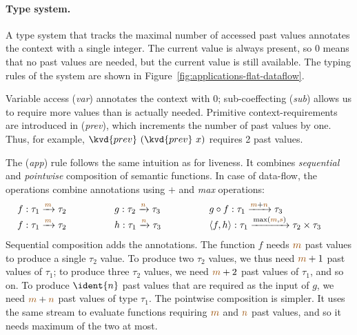 
\paragraph{Type system.}
A type system that tracks the maximal number of accessed past values annotates the context with
a single integer. The current value is always present, so $0$ means that no past values are 
needed, but the current value is still available. The typing rules of the system are shown
in Figure~\ref{fig:applications-flat-dataflow}.

Variable access (\emph{var}) annotates the context with $0$; sub-coeffecting (\emph{sub}) allows
us to require more values than is actually needed. Primitive context-requirements are introduced
in (\emph{prev}), which increments the number of past values by one. Thus, for example, 
$\kvd{prev}~(\kvd{prev}~x)$ requires 2 past values.

The (\emph{app}) rule follows the same intuition as for liveness. It combines \emph{sequential} 
and \emph{pointwise} composition of semantic functions. In case of data-flow, the operations
combine annotations using $+$ and \emph{max} operations:
%
\begin{equation*}
\begin{array}{lll}
f : \tau_1 \xrightarrow{\aclrd{m}} \tau_2 \qquad\qquad&
g : \tau_2 \xrightarrow{\aclrd{n}} \tau_3 \qquad\qquad&
g \circ f : \tau_1 \xrightarrow{\aclrd{m} + \aclrd{n}} \tau_3 \qquad\qquad
\\
f : \tau_1 \xrightarrow{\aclrd{m}} \tau_2 \qquad\qquad&
h : \tau_1 \xrightarrow{\aclrd{n}} \tau_3 \qquad\qquad&
\langle f, h \rangle : \tau_1 \xrightarrow{\textnormal{max}(\aclrd{m}, \aclrd{s})} \tau_2 \times \tau_3 \qquad
\end{array}
\end{equation*}
%
Sequential composition adds the annotations. The function $f$ needs $\aclrd{m}$ past values to 
produce a single $\tau_2$ value. To produce two $\tau_2$ values, we thus need $\aclrd{m}+1$ past
values of $\tau_1$; to produce three $\tau_2$ values, we need $\aclrd{m}+2$ past values of $\tau_1$,
and so on. To produce $\ident{n}$ past values that are required as the input of $g$, we need
$\aclrd{m}+\aclrd{n}$ past values of type $\tau_1$. The pointwise composition is simpler. It uses
the same stream to evaluate functions requiring $\aclrd{m}$ and $\aclrd{n}$ past values, and so it
needs maximum of the two at most.


